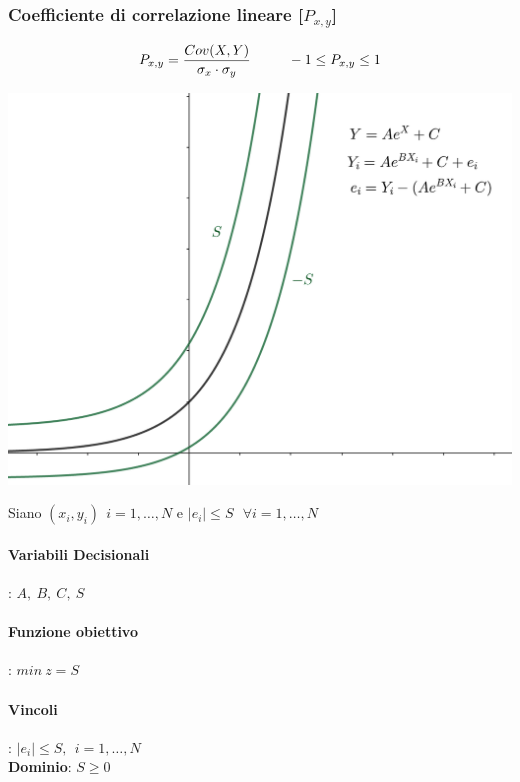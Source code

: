 \documentclass[12pt,a4paper]{article}
\begin{document}
\subsubsection{Coefficiente di correlazione lineare [$P_{x,y}$]}
$$P_{x,y} = {Cov(X,Y) \over \sigma_x \cdot \sigma_y} \ \ \ \ \ \ \ \ -1 \leq P_{x,y} \leq 1$$
\begin{center}
\includegraphics[width=0.4\columnwidth]{img/coeff_corr_lin.png}\\
\end{center}
Siano $(x_i, y_i) \ \ i=1, \dots, N$ e $|e_i| \leq S \ \ \ \forall i =1,\dots, N$
\paragraph{Variabili Decisionali}: $A,\ B,\ C,\ S$
\paragraph{Funzione obiettivo}: $min \ z = S$
\paragraph{Vincoli}: $|e_i| \leq S, \ \ i =1, \dots, N$\\
\textbf{Dominio}: $S \geq 0$
\end{document}
